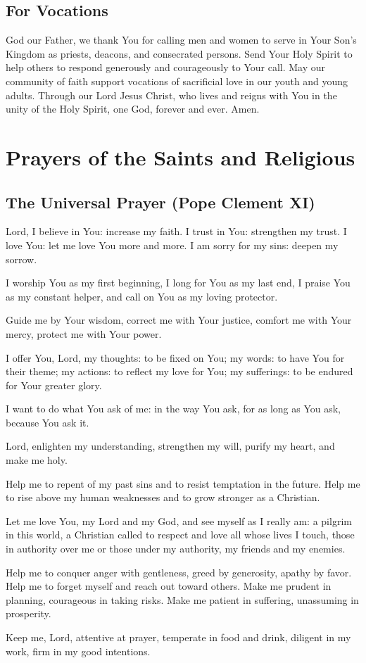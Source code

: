 \documentclass[12pt]{article}
\newcommand{\prayersection}[1]{\section{#1}}
\newcommand{\prayertitle}[1]{\subsection{#1}}
\begin{document}
\prayertitle{For Vocations}
God our Father, we thank You for calling men and women to serve in Your Son’s Kingdom as priests, deacons, and consecrated persons.
Send Your Holy Spirit to help others to respond generously and courageously to Your call.
May our community of faith support vocations of sacrificial love in our youth and young adults.
Through our Lord Jesus Christ, who lives and reigns with You in the unity of the Holy
Spirit, one God, forever and ever.
Amen.

\newpage

\prayersection{Prayers of the Saints and Religious}
\prayertitle{The Universal Prayer (Pope Clement XI)}
Lord, I believe in You: increase my faith.
I  trust in You: strengthen my trust.
I love You: let me love You more and more.
I am sorry for my sins: deepen my sorrow.

I worship You as my first beginning, I long for You as my last end, I praise You as my constant helper, and call on You as my loving protector.

Guide me by Your wisdom,
correct me with Your justice,
comfort me with Your mercy,
protect me with Your power.

I offer You, Lord, my thoughts: to be fixed on You;
my words: to have You for their theme;
my actions: to reflect my love for You;
my sufferings: to be endured for Your greater glory.

I want to do what You ask of me:
in the way You ask,
for as long as You ask,
because You ask it.

Lord, enlighten my understanding,
strengthen my will,
purify my heart,
and make me holy.

Help me to repent of my past sins and to resist temptation in the future.
Help me to rise above my human weaknesses and to grow stronger as a Christian.

Let me love You, my Lord and my God, and see myself as I really am:
a pilgrim in this world,
a Christian called to respect and love all whose lives I touch,
those in authority over me or those under my authority,
my friends and my enemies.

Help me to conquer anger with gentleness,
greed by generosity,
apathy by favor.
Help me to forget myself and reach out toward others.
Make me prudent in planning, courageous in taking risks.
Make me patient in suffering, unassuming in prosperity.

Keep me, Lord, attentive at prayer,
temperate in food and drink,
diligent in my work,
firm in my good intentions.
\end{document}
